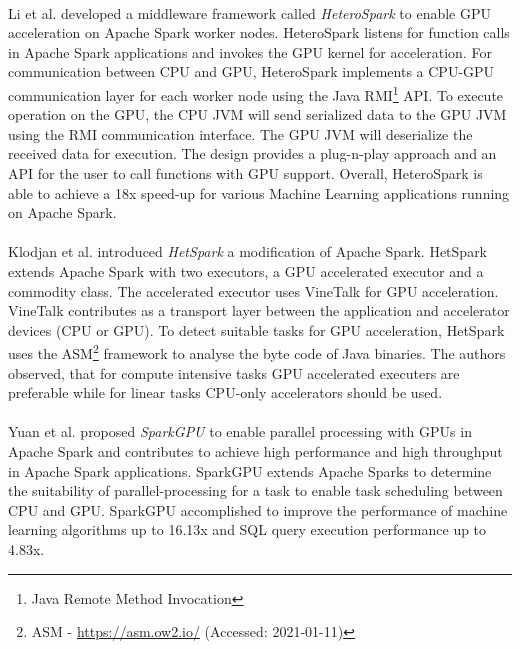 \paragraph{}Li et al. \cite{Li2015HeteroSpark} developed a middleware framework called \textit{HeteroSpark} to enable GPU acceleration on Apache Spark worker nodes. HeteroSpark listens for function calls in Apache Spark applications and invokes the GPU kernel for acceleration. For communication between CPU and GPU, HeteroSpark implements a CPU-GPU communication layer for each worker node using the Java RMI\footnote{Java Remote Method Invocation} API. To execute operation on the GPU, the CPU JVM will send serialized data to the GPU JVM using the RMI communication interface. The GPU JVM will deserialize the received data for execution.
The design provides a plug-n-play approach and an API for the user to call functions with GPU support.
Overall, HeteroSpark is able to achieve a 18x speed-up for various Machine Learning applications running on Apache Spark.


\paragraph{}Klodjan et al. \cite{Klodjan2018HetSpark} introduced \textit{HetSpark} a modification of Apache Spark.
HetSpark extends Apache Spark with two executors, a GPU accelerated executor and a commodity class. 
The accelerated executor uses VineTalk\cite{Mavridis2017VineTalk} for GPU acceleration.
VineTalk contributes as a transport layer between the application and accelerator devices (CPU or GPU).
To detect suitable tasks for GPU acceleration, HetSpark uses the ASM\footnote{ASM - \url{https://asm.ow2.io/} (Accessed: 2021-01-11)} framework to analyse the byte code of Java binaries.
The authors observed, that for compute intensive tasks GPU accelerated executers are preferable while for linear tasks CPU-only accelerators should be used.


\paragraph{}Yuan et al. \cite{Yuan2016SparkGPU} proposed \textit{SparkGPU} to enable parallel processing with GPUs in Apache Spark and contributes to achieve high performance and high throughput in Apache Spark applications.
SparkGPU extends Apache Sparks to determine the suitability of parallel-processing for a task to enable task scheduling between CPU and GPU. 
SparkGPU accomplished to improve the performance of machine learning algorithms up to 16.13x and SQL query execution performance up to 4.83x.

